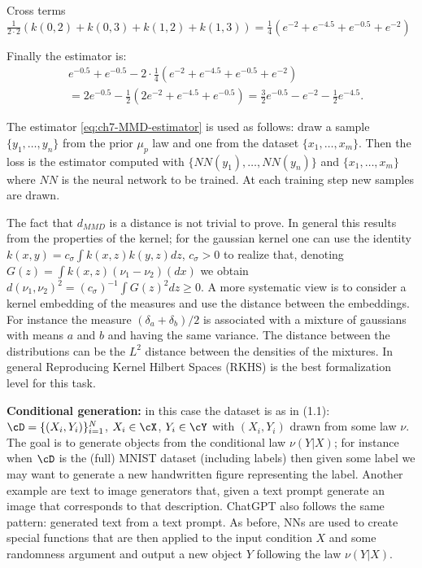 \begin{example}
Cross terms $\frac{1}{2 \cdot 2}(k(0,2) + k(0,3) + k(1,2) + k(1,3)) = \frac{1}{4}(e^{-2} + e^{-4.5} + e^{-0.5} + e^{-2})$

Finally the estimator is:
\begin{equation}\label{eq:ch7-MMD-numerical}
  \begin{aligned}
    &e^{-0.5} + e^{-0.5} - 2 \cdot \frac{1}{4}(e^{-2} + e^{-4.5} + e^{-0.5} + e^{-2}) \\
    &= 2 e^{-0.5} - \frac{1}{2}(2 e^{-2} + e^{-4.5} + e^{-0.5}) = \frac{3}{2} e^{-0.5} - e^{-2} - \frac{1}{2} e^{-4.5}.
  \end{aligned}
\end{equation}
\end{example}

The estimator \eqref{eq:ch7-MMD-estimator} is used as follows: draw a sample $\{y_1, \ldots, y_n\}$ from the prior $\mu_p$ law and one from the dataset $\{x_1, \ldots, x_m\}$. Then the loss is the estimator computed with $\{NN(y_1), \ldots, NN(y_n)\}$ and $\{x_1, \ldots, x_m\}$ where $NN$ is the neural network to be trained. At each training step new samples are drawn.

\begin{tcolorbox}[advancedbox]
\begin{advancedtopics}\label{adv:ch7-MMD-proof}
The fact that $d_{MMD}$ is a distance is not trivial to prove. In general this results from the properties of the kernel; for the gaussian kernel one can use the identity $k(x, y) = c_\sigma \int k(x, z) k(y, z) dz$, $c_\sigma > 0$ to realize that, denoting $G(z) = \int k(x, z) (\nu_1 - \nu_2)(dx)$ we obtain $d(\nu_1, \nu_2)^2 = (c_\sigma)^{-1} \int G(z)^2 dz \geq 0$.
A more systematic view is to consider a kernel embedding of the measures and use the distance between the embeddings. For instance the measure $(\delta_a + \delta_b)/2$ is associated with a mixture of gaussians with means $a$ and $b$ and having the same variance. The distance between the distributions can be the $L^2$ distance between the densities of the mixtures. In general Reproducing Kernel Hilbert Spaces (RKHS) is the best formalization level for this task.
\end{advancedtopics}
\end{tcolorbox}

\textbf{Conditional generation:} in this case the dataset is as in (1.1): $\cD = \{(X_i, Y_i)\}_{i=1}^{N}$, $X_i \in \cX$, $Y_i \in \cY$ with $(X_i, Y_i)$ drawn from some law $\nu$. The goal is to generate objects from the conditional law $\nu(Y | X)$; for instance when $\cD$ is the (full) MNIST dataset (including labels) then given some label we may want to generate a new handwritten figure representing the label. Another example are text to image generators that, given a text prompt generate an image that corresponds to that description. ChatGPT also follows the same pattern: generated text from a text prompt. As before, NNs are used to create special functions that are then applied to the input condition $X$ and some randomness argument and output a new object $Y$ following the law $\nu(Y | X)$.

